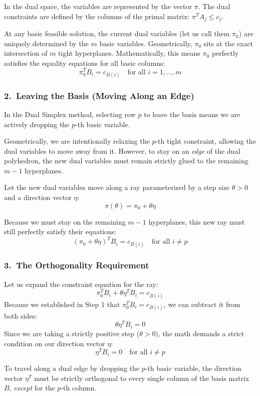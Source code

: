 \documentclass[11pt, a4paper]{article}
\begin{document}
In the dual space, the variables are represented by the vector $\pi$. The dual constraints are defined by the columns of the primal matrix: $\pi^T A_j \le c_j$.

At any basic feasible solution, the current dual variables (let us call them $\pi_0$) are uniquely determined by the $m$ basic variables. Geometrically, $\pi_0$ sits at the exact intersection of $m$ tight hyperplanes. Mathematically, this means $\pi_0$ perfectly satisfies the equality equations for all basic columns:
\[
\pi_0^T B_i = c_{B(i)} \quad \text{for all } i = 1, \dots, m
\]

\subsubsection*{2.\ Leaving the Basis (Moving Along an Edge)}

In the Dual Simplex method, selecting row $p$ to leave the basis means we are actively dropping the $p$-th basic variable. 

Geometrically, we are intentionally relaxing the $p$-th tight constraint, allowing the dual variables to move away from it. However, to stay on an \emph{edge} of the dual polyhedron, the new dual variables must remain strictly glued to the remaining $m-1$ hyperplanes. 

Let the new dual variables move along a ray parameterized by a step size $\theta > 0$ and a direction vector $\eta$:
\[
\pi(\theta) = \pi_0 + \theta \eta
\]

Because we must stay on the remaining $m-1$ hyperplanes, this new ray must still perfectly satisfy their equations:
\[
(\pi_0 + \theta \eta)^T B_i = c_{B(i)} \quad \text{for all } i \neq p
\]

\subsubsection*{3.\ The Orthogonality Requirement}

Let us expand the constraint equation for the ray:
\[
\pi_0^T B_i + \theta \eta^T B_i = c_{B(i)}
\]
Because we established in Step 1 that $\pi_0^T B_i = c_{B(i)}$, we can subtract it from both sides:
\[
\theta \eta^T B_i = 0
\]
Since we are taking a strictly positive step ($\theta > 0$), the math demands a strict condition on our direction vector $\eta$:
\[
\eta^T B_i = 0 \quad \text{for all } i \neq p
\]

\begin{definition}
To travel along a dual edge by dropping the $p$-th basic variable, the direction vector $\eta^T$ must be strictly orthogonal to every single column of the basis matrix $B$, \emph{except} for the $p$-th column.
\end{definition}
\end{document}
